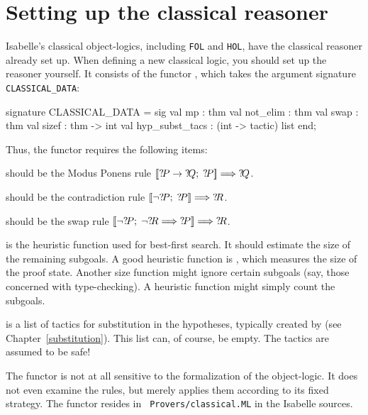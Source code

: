 \section{Setting up the classical reasoner}\label{sec:classical-setup}
Isabelle's classical object-logics, including \texttt{FOL} and \texttt{HOL}, 
have the classical reasoner already set up.  
When defining a new classical logic, you should set up the reasoner yourself.  
It consists of the \ML{} functor , which takes the 
argument signature \texttt{CLASSICAL_DATA}:
\begin{ttbox} 
signature CLASSICAL_DATA =
  sig
  val mp             : thm
  val not_elim       : thm
  val swap           : thm
  val sizef          : thm -> int
  val hyp_subst_tacs : (int -> tactic) list
  end;
\end{ttbox}
Thus, the functor requires the following items:
\begin{ttdescription}
\item[\tdxbold{mp}] should be the Modus Ponens rule
$\mathopen{[\![}{?\!P}\rightarrow{?\!Q};\; {?\!P}\mathclose{]\!]} \Longrightarrow {?\!Q}$.

\item[\tdxbold{not_elim}] should be the contradiction rule
$\mathopen{[\![}\neg{?\!P};\; {?\!P}\mathclose{]\!]} \Longrightarrow {?\!R}$.

\item[\tdxbold{swap}] should be the swap rule
$\mathopen{[\![}\neg {?\!P}; \; \neg {?\!R}\Longrightarrow {?\!P}\mathclose{]\!]} \Longrightarrow {?\!R}$.

\item[\ttindexbold{sizef}] is the heuristic function used for best-first
search.  It should estimate the size of the remaining subgoals.  A good
heuristic function is , which measures the size of the
proof state.  Another size function might ignore certain subgoals (say,
those concerned with type-checking).  A heuristic function might simply
count the subgoals.

\item[\ttindexbold{hyp_subst_tacs}] is a list of tactics for substitution in
the hypotheses, typically created by  (see
Chapter~\ref{substitution}).  This list can, of course, be empty.  The
tactics are assumed to be safe!
\end{ttdescription}
The functor is not at all sensitive to the formalization of the
object-logic.  It does not even examine the rules, but merely applies
them according to its fixed strategy.  The functor resides in {\tt
  Provers/classical.ML} in the Isabelle sources.

